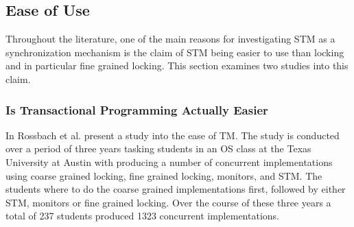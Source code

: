 %
%
%
%        
%
%
%	
%
%
%
\subsection{Ease of Use}
\label{sec:stm_ease_of_use}
Throughout the literature, one of the main reasons for investigating \ac{STM} as a synchronization mechanism is the claim of \ac{STM} being easier to use than locking and in particular fine grained locking. This section examines two studies into this claim.
\subsubsection{Is Transactional Programming Actually Easier}
\label{sec:stm_ease_rossbach}
In \cite{rossbach2010transactional} Rossbach et al. present a study into the ease of \ac{TM}. The study is conducted over a period of three years tasking students in an \ac{OS} class at the Texas University at Austin with producing a number of concurrent implementations using coarse grained locking, fine grained locking, monitors, and \ac{STM}. The students where to do the coarse grained implementations first, followed by either \ac{STM}, monitors or fine grained locking. Over the course of these three years a total of 237 students produced 1323 concurrent implementations. 

